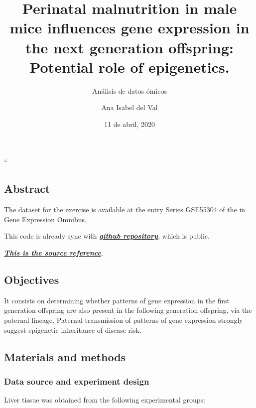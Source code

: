 \documentclass[]{article}
\title{Perinatal malnutrition in male mice influences gene expression in the
next generation offspring: Potential role of epigenetics.}
\subtitle{Análisis de datos ómicos}
\author{Ana Isabel del Val}
\date{11 de abril, 2020}
\begin{document}
\maketitle

{
\setcounter{tocdepth}{3}
\tableofcontents
}
``

\subsection{Abstract}\label{abstract}

The dataset for the exercise is available at the entry Series GSE55304
of the in Gene Expression Omnibus.

This code is already sync with
\textbf{\emph{\href{https://github.com/AnadelVal/epigeneticsGSE55304}{github
repository}}}, which is public.

\textbf{\emph{\href{https://www.ncbi.nlm.nih.gov/geo/query/acc.cgi?acc=GSE55304}{This
is the source reference}}}.

\subsection{Objectives}\label{objectives}

It consists on determining whether patterns of gene expression in the
first generation offspring are also present in the following generation
offspring, via the paternal lineage. Paternal transmission of patterns
of gene expression strongly suggest epigenetic inheritance of disease
risk.

\subsection{Materials and methods}\label{materials-and-methods}

\subsubsection{Data source and experiment
design}\label{data-source-and-experiment-design}

Liver tissue was obtained from the following experimental groups:
\end{document}
